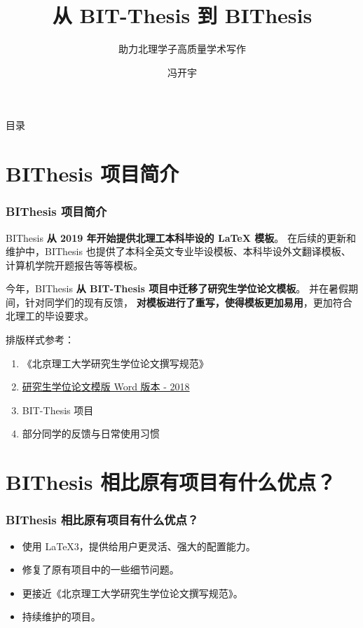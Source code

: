 \documentclass[
  aspectratio=169,
  presentation,
  titlegraphic=./images/bit.png,
  framelogo=./images/bit.png
]{bitbeamer}
\title{从 BIT-Thesis 到 BIThesis}
\subtitle{助力北理学子高质量学术写作}
\author{冯开宇}
\institute{北京理工大学}
\date{\zhdate{2022/11/21}}
\begin{document}
\frame{\titlepage}

%
%
\begin{frame}{目录}
  \tableofcontents[hideallsubsections]
\end{frame}


\section{BIThesis 项目简介}

\begin{frame}[t]
  \frametitle{BIThesis 项目简介}
  BIThesis \textbf{从 2019 年开始提供北理工本科毕设的 LaTeX 模板}。
  在后续的更新和维护中，BIThesis 也提供了本科全英文专业毕设模板、本科毕设外文翻译模板、计算机学院开题报告等等模板。

  今年，BIThesis \textbf{从 BIT-Thesis 项目中迁移了研究生学位论文模板}。
  并在暑假期间，针对同学们的现有反馈，
  \textbf{对模板进行了重写，使得模板更加易用}，更加符合北理工的毕设要求。

  \vspace{0.5cm}

  排版样式参考：
  \begin{enumerate}
    \item 《北京理工大学研究生学位论文撰写规范》
    \item \href{https://grd.bit.edu.cn/xwgz/xwgz2/wjxz_xwgz/b119746.htm}{研究生学位论文模版 Word 版本 - 2018}
    \item BIT-Thesis 项目
    \item 部分同学的反馈与日常使用习惯
  \end{enumerate}
\end{frame}




%
\section{BIThesis 相比原有项目有什么优点？}    %

\begin{frame}[t] %
  \frametitle{BIThesis 相比原有项目有什么优点？}

  \begin{itemize}
    \item 使用 LaTeX3，提供给用户更灵活、强大的配置能力。
    \item 修复了原有项目中的一些细节问题。
    \item 更接近《北京理工大学研究生学位论文撰写规范》。
    \item 持续维护的项目。
  \end{itemize}
\end{frame}
\end{document}
